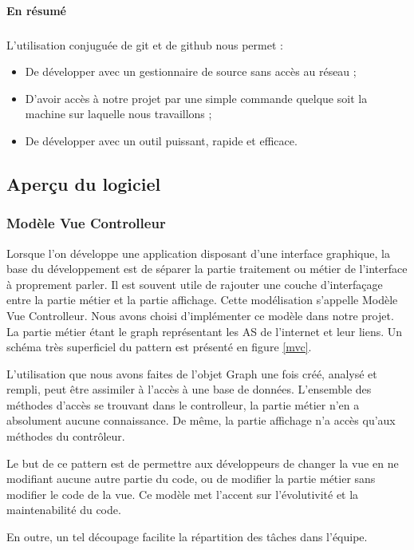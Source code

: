 \paragraph{En résumé}

\subparagraph{}L'utilisation conjuguée de git et de github nous permet :
\begin{itemize}
 \item De développer avec un gestionnaire de source sans accès au réseau ;
 \item D'avoir accès à notre projet par une simple commande quelque soit la machine sur laquelle nous travaillons ;
\item De développer avec un outil puissant, rapide et efficace.
\end{itemize}

\subsection{Aperçu du logiciel}

\subsubsection{Modèle Vue Controlleur}
\label{mvcText}
Lorsque l'on développe une application disposant d'une interface graphique, la base du développement est de séparer la partie traitement ou métier de l'interface à proprement parler. Il est souvent utile de rajouter une couche d'interfaçage entre la partie métier et la partie affichage. Cette modélisation s'appelle Modèle Vue Controlleur. Nous avons choisi d'implémenter ce modèle dans notre projet. La partie métier étant le graph représentant les AS de l'internet et leur liens. Un schéma très superficiel du pattern est présenté en figure \ref{mvc}.

L'utilisation que nous avons faites de l'objet Graph une fois créé, analysé et rempli, peut être assimiler à l'accès à une base de données. L'ensemble des méthodes d'accès se trouvant dans le controlleur, la partie métier n'en a absolument aucune connaissance. De même, la partie affichage n'a accès qu'aux méthodes du contrôleur.

Le but de ce pattern est de permettre aux développeurs de changer la vue en ne modifiant aucune autre partie du code, ou de modifier la partie métier sans modifier le code de la vue. Ce modèle met l'accent sur l'évolutivité et la maintenabilité du code. 

En outre, un tel découpage facilite la répartition des tâches dans l'équipe.


